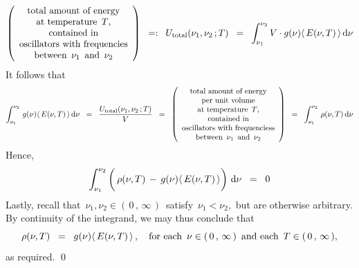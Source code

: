 \begin{equation*}
\left(\begin{array}{c}
    \textnormal{total amount of energy}
    \\
    \textnormal{at temperature \,$T$,}
    \\
    \textnormal{contained in}
    \\
    \textnormal{oscillators with frequencies}
    \\
    \textnormal{between \,$\nu_{1}$\, and \,$\nu_{2}$}
    \end{array}\right)
\;\; =: \;\;
    U_{\textnormal{total}}(\nu_{1},\nu_{2}\,;T)
\;\; = \;\;
    \int_{\nu_{1}}^{\nu_{2}} V \cdot g(\nu) \langle\,E(\nu,T)\,\rangle \,\textnormal{d}\nu
\end{equation*}
It follows that
\begin{equation*}
\int_{\nu_{1}}^{\nu_{2}}\, g(\nu) \langle\,E(\nu,T)\,\rangle \,\textnormal{d}\nu
\;\; = \;\;
    \dfrac{U_{\textnormal{total}}(\nu_{1},\nu_{2}\,;T)}{V}
\;\; = \;\;
    \left(\begin{array}{c}
        \textnormal{total amount of energy}
        \\
        \textnormal{per unit volume}
        \\
        \textnormal{at temperature \,$T$,}
        \\
        \textnormal{contained in}
        \\
        \textnormal{oscillators with frequenciess}
        \\
        \textnormal{between \,$\nu_{1}$\, and \,$\nu_{2}$}
        \end{array}\right)
\;\; = \;\;
    \int_{\nu_{1}}^{\nu_{2}}\,\rho(\nu,T)\,\textnormal{d}\nu
\end{equation*}
Hence,
\begin{equation*}
\int_{\nu_{1}}^{\nu_{2}}
    \left(\,
        \rho(\nu,T)
        \, \overset{{\color{white}1}}{-} \,
        g(\nu) \langle\,E(\nu,T)\,\rangle
        \right)
    \,\d\nu
\;\; = \;\;
    0
\end{equation*}
Lastly, recall that \,$\nu_{1}, \nu_{2} \in (\,0\,,\,\infty\,)$\,
satisfy
\,$\nu_{1} < \nu_{2}$,\,
but are otherwise arbitrary.
By continuity of the integrand, we may thus conclude that
\begin{equation*}
\rho(\nu,T)
\;\; = \;\;
    g(\nu) \langle\,E(\nu,T)\,\rangle\,,
\quad
\textnormal{for each \,$\nu \in (\,0\,,\,\infty\,)$\, and each \,$T \in (\,0\,,\,\infty\,)$},
\end{equation*}
as required.
\qed

